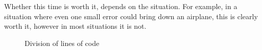 Whether this time is worth it, depends on the situation. For example, in a situation where even one small error could bring down an airplane, this is clearly worth it, however in most situations it is not.

\begin{figure}[hb!]
	\caption{Division of lines of code}
	\label{division}
\end{figure}